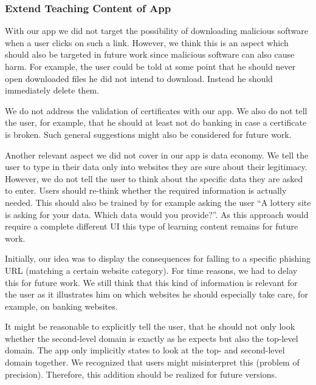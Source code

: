 \subsubsection{Extend Teaching Content of App}
\begin{description}[leftmargin=0cm]
\item[Malicious Downloads:] With our app we did not target the possibility of downloading malicious software when a user clicks on such a link.
	However, we think this is an aspect which should also be targeted in future work since malicious software can also cause harm.
	For example, the user could be told at some point that he should never open downloaded files he did not intend to download.
	Instead he should immediately delete them.
	\item[Certificate Validation:] We do not address the validation of certificates with our app. We also do not tell the user, for example, that he should at least not do banking in case a certificate is broken.
	Such general suggestions might also be considered for future work.
	\item[Data Economy:] Another relevant aspect we did not cover in our app is data economy.
	We tell the user to type in their data only into websites they are sure about their legitimacy.
	However, we do not tell the user to think about the specific data they are asked to enter.
	Users should re-think whether the required information is actually needed.
	This should also be trained by for example asking the user ``A lottery site is asking for your data. Which data would you provide?''. As this approach would require a complete different UI this type of learning content remains for future work.
	\item[Consequences:] Initially, our idea was to display the consequences for falling to a specific phishing URL (matching a certain website category). For time reasons, we had to delay this for future work.
	We still think that this kind of information is relevant for the user as it illustrates him on which websites he should especially take care, for example, on banking websites.
	\item[Top-Level Domain Attacks:] It might be reasonable to explicitly tell the user, that he should not only look whether the second-level domain is exactly as he expects but also the top-level domain. The app only implicitly states to look at the top- and second-level domain together.
We recognized that users might misinterpret this (problem of precision).
Therefore, this addition should be realized for future versions.
\end{description}

